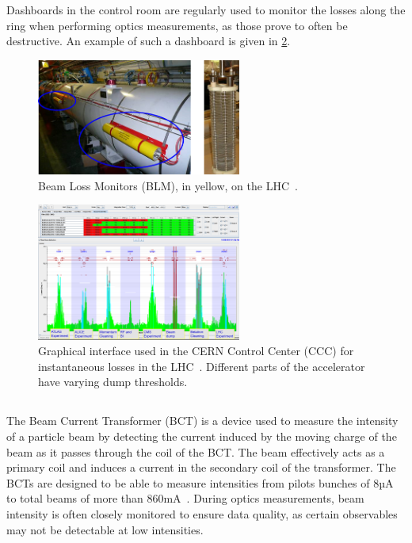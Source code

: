 Dashboards in the control room are regularly used to monitor the losses along the ring when
performing optics measurements, as those prove to often be destructive. An example of such a
dashboard is given in \cref{fig:beam_instrumentation:blm2}.

\begin{figure}[H]
    \centering
    \includegraphics[width=0.6\textwidth]{images/blm.png}
    \caption{Beam Loss Monitors (BLM), in yellow, on the LHC~\cite{schmidt_machine_2014}.}
    \label{fig:beam_instrumentation:blm1}
\end{figure}

\begin{figure}[H]
    \centering
    \includegraphics[width=0.6\textwidth]{images/blm2.png}
    \caption{Graphical interface used in the CERN Control Center (CCC) for instantaneous losses in
    the LHC~\cite{schmidt_machine_2014}. Different parts of the accelerator have varying dump
    thresholds.}
    \label{fig:beam_instrumentation:blm2}
\end{figure}


\subsection{}

The Beam Current Transformer (BCT) is a device used to measure the intensity of a particle beam by
detecting the current induced by the moving charge of the beam as it passes through the coil of the
BCT. The beam effectively acts as a primary coil and induces a current in the secondary coil of the
transformer.
The BCTs are designed to be able to measure intensities from pilots bunches of 8µA to total beams of
more than 860mA~\cite{odier_dcct_2009}. During optics measurements, beam intensity is often closely
monitored to ensure data quality, as certain observables may not be detectable at low intensities.


